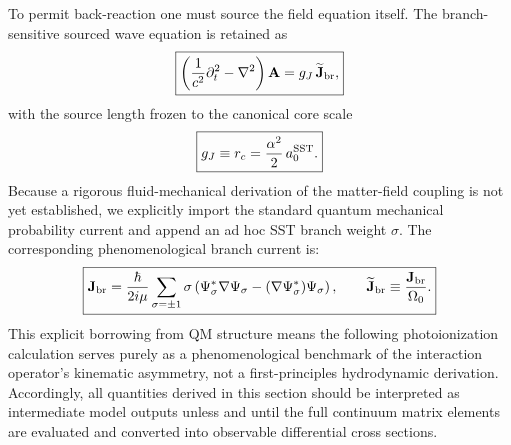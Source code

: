 \documentclass[11pt,a4paper]{article}
\begin{document}
    To permit back-reaction one must source the field equation itself. The branch-sensitive sourced wave equation is retained as
    \begin{equation}
        \label{eq:Awave-source}
        \boxed{
            \left(\frac{1}{c^2}\partial_t^2-\nabla^2\right)\mathbf A
            =
            g_J \,\widetilde{\mathbf J}_{\rm br},
        }
    \end{equation}
    with the source length frozen to the canonical core scale
    \begin{equation}
        \label{eq:gJfreeze}
        \boxed{
            g_J \equiv r_c = \frac{\alpha^2}{2}\,a_0^{\rm SST}.
        }
    \end{equation}
    Because a rigorous fluid-mechanical derivation of the matter-field coupling is not yet established, we explicitly import the standard quantum mechanical probability current and append an ad hoc SST branch weight $\sigma$. The corresponding phenomenological branch current is:
    \begin{equation}
        \label{eq:Jbr}
        \boxed{
            \mathbf J_{\rm br}
            =
            \frac{\hbar}{2 i \mu}
            \sum_{\sigma=\pm 1}
            \sigma
            \left(
                \Psi_\sigma^*\nabla\Psi_\sigma
                -
                (\nabla\Psi_\sigma^*)\Psi_\sigma
            \right),
            \qquad
            \widetilde{\mathbf J}_{\rm br}\equiv \frac{\mathbf J_{\rm br}}{\Omega_0}.
        }
    \end{equation}
    This explicit borrowing from QM structure means the following photoionization calculation serves purely as a phenomenological benchmark of the interaction operator's kinematic asymmetry, not a first-principles hydrodynamic derivation. Accordingly, all quantities derived in this section should be interpreted as intermediate model outputs unless and until the full continuum matrix elements are evaluated and converted into observable differential cross sections.
    
\end{document}
